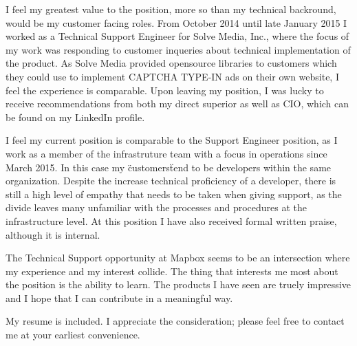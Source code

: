 \documentclass[11pt,a4paper,sans]{moderncv}        %
\begin{document}
I feel my greatest value to the position, more so than my technical backround, would be my customer facing roles. From October 2014 until late January 2015 I worked as a Technical Support Engineer for Solve Media, Inc., where the focus of my work was responding to customer inqueries about technical implementation of the product. As Solve Media provided opensource libraries to customers which they could use to implement CAPTCHA TYPE-IN ads on their own website, I feel the experience is comparable. Upon leaving my position, I was lucky to receive recommendations from both my direct superior as well as CIO, which can be found on my LinkedIn profile.

I feel my current position is comparable to the Support Engineer position, as I work as a member of the infrastruture team with a focus in operations since March 2015. In this case my \"customers\" tend to be developers within the same organization. Despite the increase technical proficiency of a developer, there is still a high level of empathy that needs to be taken when giving support, as the divide leaves many unfamiliar with the processes and procedures at the infrastructure level. At this position I have also received formal written praise, although it is internal.

The Technical Support opportunity at Mapbox seems to be an intersection where my experience and my interest collide. The thing that interests me most about the position is the ability to learn. The products I have seen are truely impressive and I hope that I can contribute in a meaningful way.

My resume is included. I appreciate the consideration; please feel free to contact me at your earliest convenience.

\makeletterclosing
\end{document}
